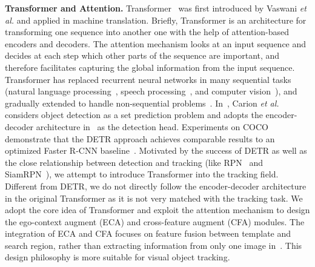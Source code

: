 \documentclass[final]{cvpr}
\begin{document}
{\noindent \textbf{Transformer and Attention.}} 
Transformer~\cite{2017Attention} was first introduced by Vaswani \emph{et al.} and applied in machine translation. 
Briefly, Transformer is an architecture for transforming one sequence into another one with the help of attention-based 
encoders and decoders. 
The attention mechanism looks at an input sequence and decides at each step which other parts of the sequence are important, 
and therefore facilitates capturing the global information from the input sequence. 
Transformer has replaced recurrent neural networks in many sequential tasks (natural language processing~\cite{BERT}, 
speech processing~\cite{LibriSpeech,ASR}, and computer vision~\cite{ImgTrans}), and gradually extended to handle 
non-sequential problems~\cite{ViT,DETR}.
In~\cite{DETR}, Carion \emph{et al.} considers object detection as 
a set prediction problem and adopts the encoder-decoder architecture in~\cite{2017Attention} as the detection head. 
Experiments on COCO~\cite{COCO} demonstrate that the DETR approach achieves comparable results to an optimized Faster R-CNN 
baseline~\cite{FasterRCNN}.
Motivated by the success of DETR 
as well as the close relationship between detection and tracking (like RPN~\cite{FasterRCNN} and SiamRPN~\cite{SiameseRPN}), we attempt to introduce Transformer into the tracking field. 
Different from DETR, we do not directly  
follow the encoder-decoder architecture in the original Transformer 
as it is not very matched with the tracking task. 
We adopt the core idea of Transformer and exploit the attention mechanism to design the ego-context augment (ECA) and 
cross-feature augment (CFA) modules. 
The integration of ECA and CFA focuses on feature fusion between template and search region, rather than extracting  
information from only one image in~\cite{DETR}. 
This design philosophy is more suitable for visual object tracking. 
\end{document}
